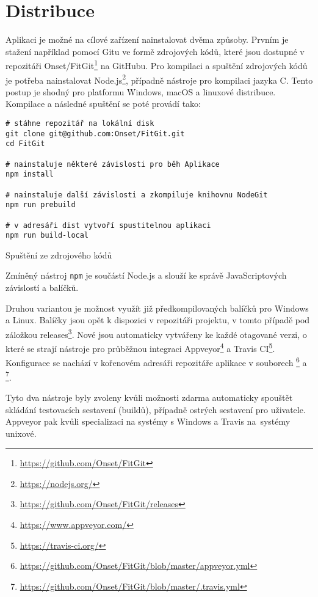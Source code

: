 \chapter{Distribuce}

Aplikaci je možné na cílové zařízení nainstalovat dvěma způsoby. Prvním je stažení například pomocí Gitu ve formě zdrojových kódů, které jsou dostupné v repozitáři Onset/FitGit\footnote{\url{https://github.com/Onset/FitGit}} na GitHubu. Pro kompilaci a spuštění zdrojových kódů je potřeba nainstalovat Node.js\footnote{\url{https://nodejs.org/}}, případně nástroje pro kompilaci jazyka C. Tento postup je shodný pro platformu Windows, macOS a linuxové distribuce. Kompilace a následné spuštění se poté provádí tako:

\FloatBarrier
\begin{listing}[ht]
	\begin{verbatim}
# stáhne repozitář na lokální disk
git clone git@github.com:Onset/FitGit.git
cd FitGit

# nainstaluje některé závislosti pro běh Aplikace
npm install

# nainstaluje další závislosti a zkompiluje knihovnu NodeGit
npm run prebuild

# v adresáři dist vytvoří spustitelnou aplikaci
npm run build-local
	\end{verbatim}
	\caption{Spuštění ze zdrojového kódů}
\end{listing}
\FloatBarrier

Zmíněný nástroj \texttt{npm} je součástí Node.js a slouží ke správě JavaScriptových závislostí a balíčků.

Druhou variantou je možnost využít již předkompilovaných balíčků pro Windows a Linux. Balíčky jsou opět k dispozici v repozitáři projektu, v tomto případě pod záložkou releases\footnote{\url{https://github.com/Onset/FitGit/releases}}. Nové jsou automaticky vytvářeny ke každé otagované verzi, o které se strají nástroje pro průběžnou integraci Appveyor\footnote{\url{https://www.appveyor.com/}} a Travis CI\footnote{\url{https://travis-ci.org/}}. Konfigurace se nachází v kořenovém adresáři repozitáře aplikace v souborech \footnote{\url{https://github.com/Onset/FitGit/blob/master/appveyor.yml}} a \footnote{\url{https://github.com/Onset/FitGit/blob/master/.travis.yml}}.

Tyto dva nástroje byly zvoleny kvůli možnosti zdarma automaticky spouštět skládání testovacích sestavení (buildů), případně ostrých sestavení pro uživatele. Appveyor pak kvůli specializaci na systémy s Windows a Travis na~systémy unixové.

